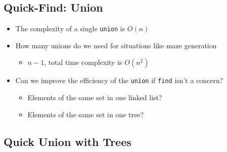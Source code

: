 \documentclass[
  10pt,
  english,
  letterpaper,
,tablecaptionabove
]{scrartcl}
\newcommand{\passthrough}[1]{#1}
\providecommand{\tightlist}{%
  \setlength{\itemsep}{0pt}\setlength{\parskip}{0pt}}
\begin{document}
\hypertarget{quick-find-union}{%
\subsection{Quick-Find: Union}\label{quick-find-union}}

\begin{itemize}
\tightlist
\item
  The complexity of a single \passthrough{\lstinline!union!} is \(O(n)\)
\item
  How many unions do we need for situations like maze generation

  \begin{itemize}
  \tightlist
  \item
    \(n-1\), total time complexity is \(O(n^2)\)
  \end{itemize}
\item
  Can we improve the efficiency of the \passthrough{\lstinline!union!}
  if \passthrough{\lstinline!find!} isn't a concern?

  \begin{itemize}
  \tightlist
  \item
    Elements of the same set in one linked list?
  \item
    Elements of the same set in one tree?
  \end{itemize}
\end{itemize}

\hypertarget{quick-union-with-trees}{%
\subsection{Quick Union with Trees}\label{quick-union-with-trees}}
\end{document}
